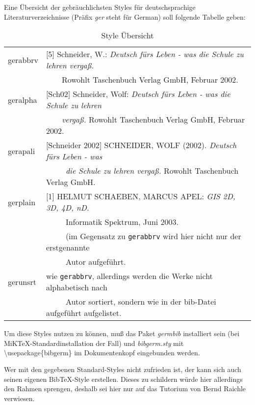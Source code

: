 \newpage

Eine Übersicht der gebräuchlichsten Styles für deutschsprachige Literaturverzeichnisse
(Präfix \textit{ger} steht für German) soll folgende Tabelle geben:

\begin{table}[ht]
	\centering
		\begin{tabular}{|l|l|}
			\hline
				gerabbrv &$[$5$]$ Schneider, W.: \emph{Deutsch fürs Leben - was die Schule zu lehren 				 vergaß.}\\
				&\ \ \ \ Rowohlt Taschenbuch Verlag GmbH, Februar 2002.\\
			\hline
				geralpha &$[$Sch02$]$ Schneider, Wolf: \emph{Deutsch fürs Leben - was die Schule zu
				lehren}\\
				&\ \ \ \ \emph{vergaß.} Rowohlt Taschenbuch Verlag GmbH, Februar 2002.\\
			\hline
			  gerapali &$[$Schneider 2002$]$ SCHNEIDER, WOLF (2002). \emph{Deutsch fürs Leben - 					was}\\
			  &\ \ \ \ \ \emph{die Schule zu lehren vergaß.} Rowohlt Taschenbuch Verlag GmbH.\\
			\hline
				gerplain &$[$1$]$ HELMUT SCHAEBEN, MARCUS APEL: \emph{GIS 2D, 3D, 4D, nD.}\\
				&\ \ \ \ \ Informatik Spektrum, Juni 2003.\\
				&\ \ \ \ \ (im Gegensatz zu \texttt{gerabbrv} wird hier nicht nur der erstgenannte\\
				&\ \ \ \ \  Autor aufgeführt.\\
			\hline
			  gerunsrt &wie \texttt{gerabbrv}, allerdings werden die Werke nicht alphabetisch nach\\
			  &\ \ \ \ \  Autor sortiert, sondern wie in der bib-Datei aufgeführt aufgelistet.\\
			  \hline
		\end{tabular}
	\caption{Style Übersicht}
	\label{tab:style_uebersicht}
\end{table}

Um diese Styles nutzen zu können, muß das Paket \textit{germbib} installiert sein (bei MiKTeX-Standardinstallation der Fall) und \textit{bibgerm.sty} mit \textbackslash usepackage\{bibgerm\} im Dokumentenkopf eingebunden werden.

Wer mit den gegebenen Standard-Styles nicht zufrieden ist, der kann sich auch seinen
eigenen Bib\TeX-Style erstellen. Dieses zu schildern würde hier allerdings den Rahmen
sprengen, deshalb sei hier nur auf das Tutorium von Bernd Raichle \cite{raichle:bibtex_programmierung} verwiesen.

